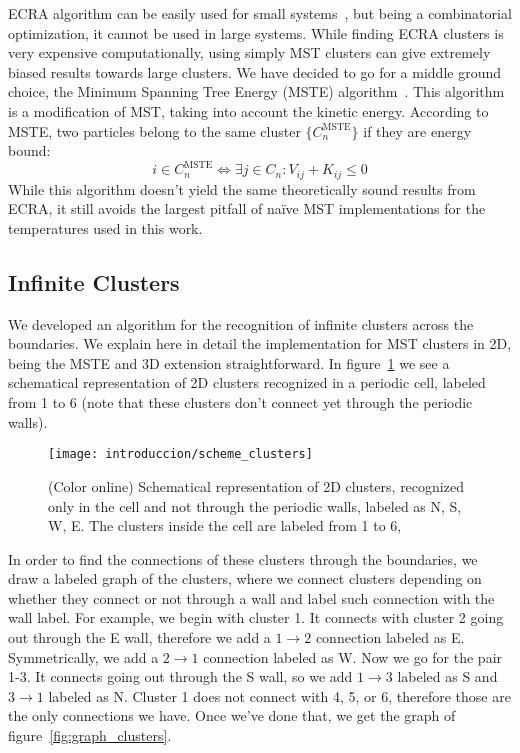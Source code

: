 ECRA algorithm can be easily used for small
systems~\cite{dorso_fluctuation_1994}, but being a combinatorial
optimization, it cannot be used in large systems. While finding ECRA
clusters is very expensive computationally, using simply MST clusters
can give extremely biased results towards large clusters. We have
decided to go for a middle ground choice, the Minimum Spanning Tree
Energy (MSTE) algorithm~\cite{dorso_topological_2012}. This algorithm
is a modification of MST, taking into account the kinetic
energy. According to MSTE, two particles belong to the same cluster
$\{C^{\text{MSTE}}_n\}$ if they are energy bound:
\begin{equation*}
  i \in C^{\text{MSTE}}_n \Leftrightarrow \exists j \in C_n :
  V_{ij}+ K_{ij} \le 0
\end{equation*}
While this algorithm doesn't yield the same theoretically sound
results from ECRA, it still avoids the largest pitfall of naïve MST
implementations for the temperatures used in this work.

\subsection{Infinite Clusters}
We developed an algorithm for the recognition of infinite clusters
across the boundaries. We explain here in detail the implementation
for MST clusters in 2D, being the MSTE and 3D extension
straightforward. In figure~\ref{fig:scheme_clusters} we see a
schematical representation of 2D clusters recognized in a periodic
cell, labeled from 1 to 6 (note that these clusters don't connect yet
through the periodic walls).

\begin{figure}  \centering
  \texttt{[image: introduccion/scheme\_clusters]}
  \caption{(Color online) Schematical representation of 2D clusters, recognized only
    in the cell and not through the periodic walls, labeled as N, S,
    W, E. The clusters inside the cell are labeled from 1 to 6,}
\label{fig:scheme_clusters}
\end{figure}

In order to find the connections of these clusters through the
boundaries, we draw a labeled graph of the clusters, where we connect
clusters depending on whether they connect or not through a wall and
label such connection with the wall label. For example, we begin with
cluster 1. It connects with cluster 2 going out through the E wall,
therefore we add a $1\rightarrow2$ connection labeled as
E. Symmetrically, we add a $2\rightarrow1$ connection labeled as W. Now
we go for the pair 1-3. It connects going out through the S wall, so
we add $1\rightarrow3$ labeled as S and $3\rightarrow1$ labeled as
N. Cluster 1 does not connect with 4, 5, or 6, therefore those are the
only connections we have. Once we've done that, we get the graph of
figure~\ref{fig:graph_clusters}.

